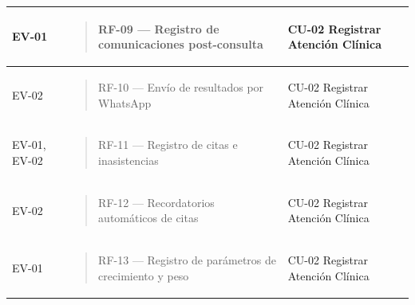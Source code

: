 \documentclass[
]{article}
\newcounter{none} %
\begin{document}
{\def\LTcaptype{none} %
\begin{longtable}[]{@{}
  >{\raggedright\arraybackslash}p{}
  >{\raggedright\arraybackslash}p{}
  >{\raggedright\arraybackslash}p{}@{}}
\toprule\noalign{}
\begin{minipage}[b]{\linewidth}\raggedright
EV-01
\end{minipage} & \begin{minipage}[b]{\linewidth}\raggedright
\begin{quote}
RF-09 --- Registro de comunicaciones post-consulta
\end{quote}
\end{minipage} & \begin{minipage}[b]{\linewidth}\raggedright
CU-02 Registrar Atención Clínica
\end{minipage} \\
\midrule\noalign{}
\endhead
\bottomrule\noalign{}
\endlastfoot
EV-02 & \begin{minipage}[t]{\linewidth}\raggedright
\begin{quote}
RF-10 --- Envío de resultados por WhatsApp
\end{quote}
\end{minipage} & CU-02 Registrar Atención Clínica \\
EV-01, EV-02 & \begin{minipage}[t]{\linewidth}\raggedright
\begin{quote}
RF-11 --- Registro de citas e inasistencias
\end{quote}
\end{minipage} & CU-02 Registrar Atención Clínica \\
EV-02 & \begin{minipage}[t]{\linewidth}\raggedright
\begin{quote}
RF-12 --- Recordatorios automáticos de citas
\end{quote}
\end{minipage} & CU-02 Registrar Atención Clínica \\
EV-01 & \begin{minipage}[t]{\linewidth}\raggedright
\begin{quote}
RF-13 --- Registro de parámetros de crecimiento y peso
\end{quote}
\end{minipage} & CU-02 Registrar Atención Clínica \\

\end{longtable}}
\end{document}
